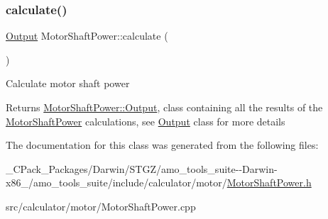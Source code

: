 \subsubsection{\texorpdfstring{calculate()}{calculate()}\hspace{0.1cm}{\footnotesize\ttfamily [3/3]}}
{\footnotesize\ttfamily \hyperlink{struct_motor_shaft_power_1_1_output}{Output} Motor\+Shaft\+Power\+::calculate (\begin{DoxyParamCaption}{ }\end{DoxyParamCaption})}

Calculate motor shaft power \begin{DoxyReturn}{Returns}
\hyperlink{struct_motor_shaft_power_1_1_output}{Motor\+Shaft\+Power\+::\+Output}, class containing all the results of the \hyperlink{class_motor_shaft_power}{Motor\+Shaft\+Power} calculations, see \hyperlink{struct_motor_shaft_power_1_1_output}{Output} class for more details 
\end{DoxyReturn}


The documentation for this class was generated from the following files\+:\begin{DoxyCompactItemize}
\item 
\+\_\+\+C\+Pack\+\_\+\+Packages/\+Darwin/\+S\+T\+G\+Z/amo\+\_\+tools\+\_\+suite-\/-\/\+Darwin-\/x86\+\_/amo\+\_\+tools\+\_\+suite/include/calculator/motor/\hyperlink{___c_pack___packages_2_darwin_2_s_t_g_z_2amo__tools__suite--_darwin-x86__64_2amo__tools__suite_25a2bab1d3b39e40805901bac3991bdf5}{Motor\+Shaft\+Power.\+h}\item 
src/calculator/motor/Motor\+Shaft\+Power.\+cpp\end{DoxyCompactItemize}
